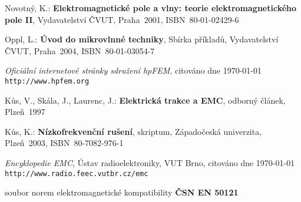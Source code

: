 
%


\begin{thebibliography}{9}
{\sc Novotný, K.:}  {\bf Elektromagnetické pole a vlny: teorie elektromagnetického pole II},
Vydavatelství ČVUT, Praha~2001, \mbox{ISBN 80-01-02429-6}

{\sc Oppl, L.:}  {\bf Úvod do mikrovlnné techniky},
Sbírka příkladů, Vydavatelství ČVUT, Praha~2004, \mbox{ISBN 80-01-03054-7}

{\em Oficiální internetové stránky sdružení hpFEM},
citováno dne \today \\
\texttt{http://www.hpfem.org}

{\sc Kůs, V., Skála, J., Laurenc, J.:}  {\bf Elektrická trakce a EMC},
odborný článek, Plzeň~1997

{\sc Kůs, K.:}  {\bf Nízkofrekvenční rušení},
skriptum, Západočeská univerzita, Plzeň~2003, \mbox{ISBN 80-7082-976-1}

{\em Encyklopedie EMC}, Ústav radioelektroniky, VUT Brno,
citováno dne \today \\
\texttt{http://www.radio.feec.vutbr.cz/emc}

soubor norem elektromagnetické kompatibility  {\bf ČSN EN 50121}

\end{thebibliography}

